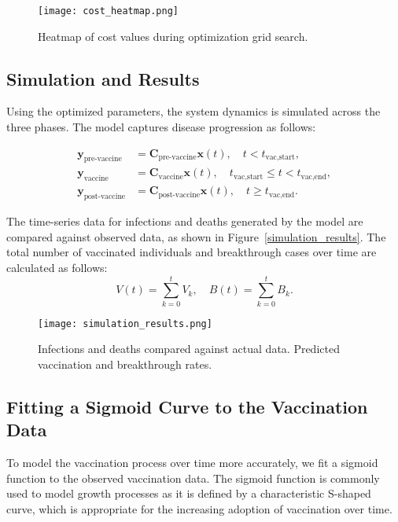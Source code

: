 \documentclass[conference]{IEEEtran}
\begin{document}
\begin{figure}[htbp]
\centerline{\texttt{[image: cost\_heatmap.png]}}
\caption{Heatmap of cost values during optimization grid search.}
\label{fig:cost_heatmap}
\end{figure}

\subsection{Simulation and Results}
Using the optimized parameters, the system dynamics is simulated across the three phases. The model captures disease progression as follows:

\begin{align}
    \mathbf{y}_{\text{pre-vaccine}} &= \mathbf{C}_{\text{pre-vaccine}} \mathbf{x}(t), \quad t < t_{\text{vac,start}}, \\
    \mathbf{y}_{\text{vaccine}} &= \mathbf{C}_{\text{vaccine}} \mathbf{x}(t), \quad t_{\text{vac,start}} \leq t < t_{\text{vac,end}}, \\
    \mathbf{y}_{\text{post-vaccine}} &= \mathbf{C}_{\text{post-vaccine}} \mathbf{x}(t), \quad t \geq t_{\text{vac,end}}.
\end{align}

The time-series data for infections and deaths generated by the model are compared against observed data, as shown in Figure~\ref{simulation_results}. The total number of vaccinated individuals and breakthrough cases over time are calculated as follows:
\begin{equation}
    V(t) = \sum_{k=0}^t V_k, \quad B(t) = \sum_{k=0}^t B_k.
\end{equation}

\begin{figure}[htbp]
\centerline{\texttt{[image: simulation\_results.png]}}
\caption{Infections and deaths compared against actual data. Predicted vaccination and breakthrough rates.}
\label{fig:simulation_results}
\end{figure}

\subsection{Fitting a Sigmoid Curve to the Vaccination Data}

To model the vaccination process over time more accurately, we fit a sigmoid function to the observed vaccination data. The sigmoid function is commonly used to model growth processes as it is defined by a characteristic S-shaped curve, which is appropriate for the increasing adoption of vaccination over time.
\end{document}

